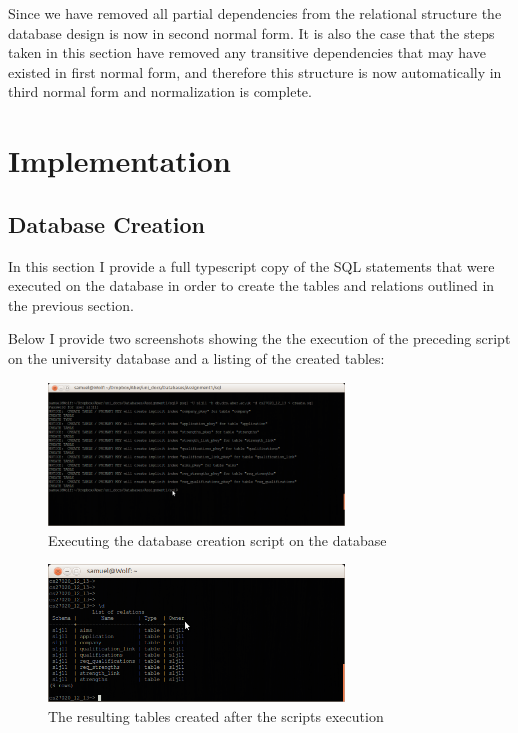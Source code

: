 \documentclass{article}
\begin{document}
Since we have removed all partial dependencies from the relational structure the database design is now in second normal form. It is also the case that the steps taken in this section have removed any transitive dependencies that may have existed in first normal form, and therefore this structure is now automatically in third normal form and normalization is complete.

\section{Implementation}
\subsection{Database Creation}
In this section I provide a full typescript copy of the SQL statements that were executed on the database in order to create the tables and relations outlined in the previous section.



Below I provide two screenshots showing the the execution of the preceding script on the university database and a listing of the created tables:

\begin{figure}[H]
\centering
\includegraphics[width=0.7\textwidth]{img/db-create.png}
\caption{Executing the database creation script on the database}
\label{fig:db-create}
\end{figure}

\begin{figure}[H]
\centering
\includegraphics[width=0.7\textwidth]{img/db-show-tables.png}
\caption{The resulting tables created after the scripts execution}
\label{fig:db-show-tables}
\end{figure}
\end{document}
